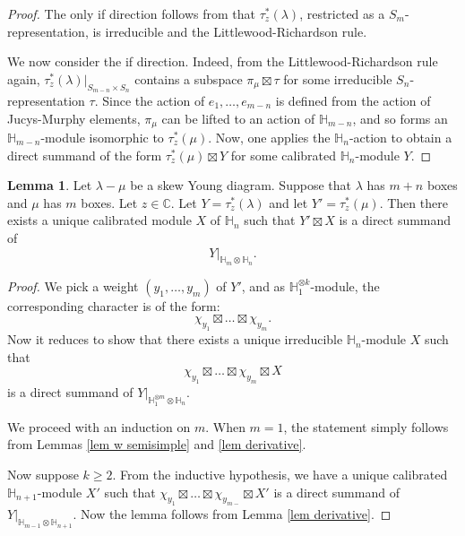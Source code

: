 \documentclass[11pt]{amsart}
\numberwithin{equation}{section}
\theoremstyle{definition}
\newtheorem{lemma}[thm]{Lemma}
\begin{document}
\begin{proof}
The only if direction follows from that $\tau_z^*(\lambda)$, restricted as a $S_m$-representation, is irreducible and the Littlewood-Richardson rule. 

We now consider the if direction. Indeed, from the Littlewood-Richardson rule again, $\tau^*_z(\lambda)|_{S_{m-n}\times S_{n}}$ contains a subspace $\pi_{\mu}\boxtimes \tau$ for some irreducible $S_{n}$-representation $\tau$. Since the action of $e_1, \ldots, e_{m-n}$ is defined from the action of Jucys-Murphy elements, $\pi_{\mu}$ can be lifted to an action of $\mathbb H_{m-n}$, and so forms an $\mathbb H_{m-n}$-module isomorphic to $\tau_z^*(\mu)$. Now, one applies the $\mathbb H_{n}$-action to obtain a direct summand of the form $\tau^*_z(\mu)\boxtimes Y$ for some calibrated $\mathbb H_{n}$-module $Y$.
\end{proof}







\begin{lemma} \label{lem construct calibrated module}
Let $\lambda -\mu$ be a skew Young diagram. Suppose that $\lambda$ has $m+n$ boxes and $\mu$ has $m$ boxes. Let $z \in \mathbb C$. Let $Y=\tau^{*}_{z}(\lambda)$ and let $Y'=\tau^{*}_{z}(\mu)$. Then there exists a unique calibrated module $X$ of $\mathbb H_{n}$ such that $Y'\boxtimes X$ is a direct summand of 
\[     Y|_{\mathbb H_m \otimes \mathbb H_{n}} .
\]
\end{lemma}


\begin{proof}
We pick a weight $(y_1, \ldots, y_m)$ of $Y'$, and as $\mathbb H_1^{\otimes k}$-module, the corresponding character is of the form:
\[  \chi_{y_1}\boxtimes \ldots \boxtimes \chi_{y_m} . \]
Now it reduces to show that there exists a unique irreducible $\mathbb H_{n}$-module $X$ such that 
\[  \chi_{y_1}\boxtimes \ldots \boxtimes \chi_{y_m} \boxtimes X
\]
is a direct summand of $Y|_{\mathbb H_1^{\otimes m}\otimes \mathbb H_{n}}$.


We proceed with an induction on $m$. When $m=1$, the statement simply follows from Lemmas \ref{lem w semisimple} and \ref{lem derivative}. 

Now suppose $k \geq 2$. From the inductive hypothesis, we have a unique calibrated $\mathbb H_{n+1}$-module $X'$ such that $\chi_{y_1}\boxtimes \ldots \boxtimes \chi_{y_{m-}}\boxtimes X'$ is a direct summand of $Y|_{\mathbb H_{m-1}\otimes \mathbb H_{n+1}}$. Now the lemma follows from Lemma \ref{lem derivative}.
\end{proof}
\end{document}
